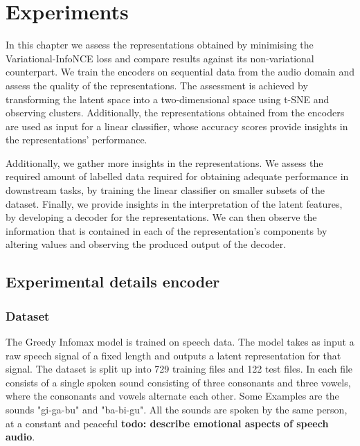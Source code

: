 \chapter{Experiments}

In this chapter we assess the representations obtained by minimising the Variational-InfoNCE loss and compare results against its non-variational counterpart. We train the encoders on sequential data from the audio domain and assess the quality of the representations. The assessment is achieved by transforming the latent space into a two-dimensional space using t-SNE and observing clusters. Additionally, the representations obtained from the encoders are used as input for a linear classifier, whose accuracy scores provide insights in the representations' performance.

Additionally, we gather more insights in the representations. We assess the required amount of labelled data required for obtaining adequate performance in downstream tasks, by training the linear classifier on smaller subsets of the dataset. Finally, we provide insights in the interpretation of the latent features, by developing a decoder for the representations. We can then observe the information that is contained in each of the representation's components by altering values and observing the produced output of the decoder. 


%	

	







\section{Experimental details encoder}

	
	
	\subsection{Dataset}
		The Greedy Infomax model is trained on speech data. The model takes as input a raw speech signal of a fixed length and outputs a latent representation for that signal. The dataset is split up into 729 training files and 122 test files. In each file consists of a single spoken sound consisting of three consonants and three vowels, where the consonants and vowels alternate each other. Some Examples are the sounds "gi-ga-bu" and "ba-bi-gu". All the sounds are spoken by the same person, at a constant and peaceful \textbf{todo: describe emotional aspects of speech audio}. 
		
